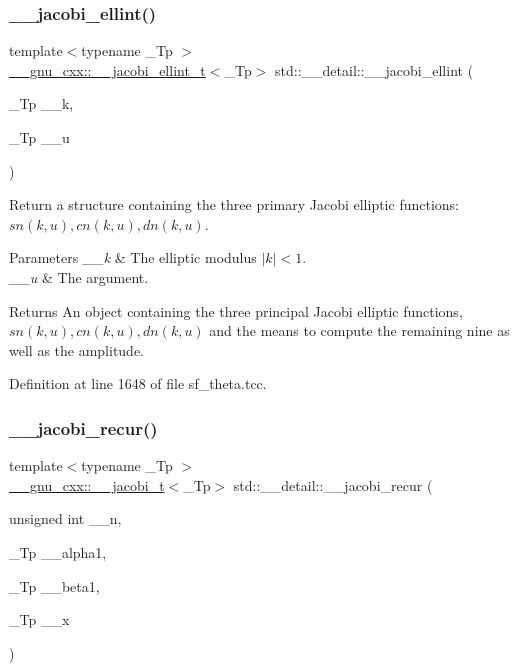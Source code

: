 \subsubsection{\texorpdfstring{\+\_\+\+\_\+jacobi\+\_\+ellint()}{\_\_jacobi\_ellint()}}
{\footnotesize\ttfamily template$<$typename \+\_\+\+Tp $>$ \\
\hyperlink{struct____gnu__cxx_1_1____jacobi__ellint__t}{\+\_\+\+\_\+gnu\+\_\+cxx\+::\+\_\+\+\_\+jacobi\+\_\+ellint\+\_\+t}$<$\+\_\+\+Tp$>$ std\+::\+\_\+\+\_\+detail\+::\+\_\+\+\_\+jacobi\+\_\+ellint (\begin{DoxyParamCaption}\item[{\+\_\+\+Tp}]{\+\_\+\+\_\+k,  }\item[{\+\_\+\+Tp}]{\+\_\+\+\_\+u }\end{DoxyParamCaption})}

Return a structure containing the three primary Jacobi elliptic functions\+: $ sn(k, u), cn(k, u), dn(k, u) $.


\begin{DoxyParams}{Parameters}
{\em \+\_\+\+\_\+k} & The elliptic modulus $ |k| < 1 $. \\
\hline
{\em \+\_\+\+\_\+u} & The argument. \\
\hline
\end{DoxyParams}
\begin{DoxyReturn}{Returns}
An object containing the three principal Jacobi elliptic functions, $ sn(k, u), cn(k, u), dn(k, u) $ and the means to compute the remaining nine as well as the amplitude. 
\end{DoxyReturn}


Definition at line 1648 of file sf\+\_\+theta.\+tcc.

\mbox{\label{namespacestd_1_1____detail_a35edf888e09012d7059e690507ef42ad}} 
\subsubsection{\texorpdfstring{\+\_\+\+\_\+jacobi\+\_\+recur()}{\_\_jacobi\_recur()}}
{\footnotesize\ttfamily template$<$typename \+\_\+\+Tp $>$ \\
\hyperlink{struct____gnu__cxx_1_1____jacobi__t}{\+\_\+\+\_\+gnu\+\_\+cxx\+::\+\_\+\+\_\+jacobi\+\_\+t}$<$\+\_\+\+Tp$>$ std\+::\+\_\+\+\_\+detail\+::\+\_\+\+\_\+jacobi\+\_\+recur (\begin{DoxyParamCaption}\item[{unsigned int}]{\+\_\+\+\_\+n,  }\item[{\+\_\+\+Tp}]{\+\_\+\+\_\+alpha1,  }\item[{\+\_\+\+Tp}]{\+\_\+\+\_\+beta1,  }\item[{\+\_\+\+Tp}]{\+\_\+\+\_\+x }\end{DoxyParamCaption})}

